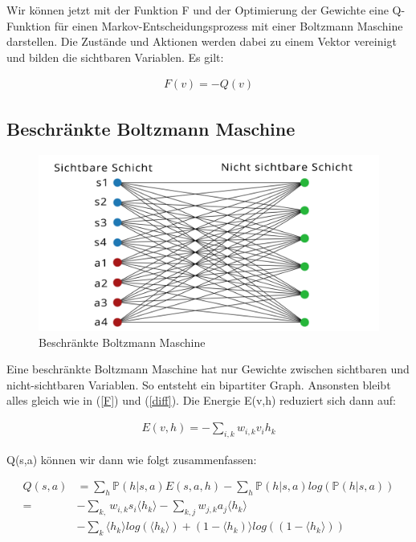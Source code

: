 Wir können jetzt mit der Funktion F und der Optimierung der Gewichte eine Q-Funktion für einen Markov-Entscheidungsprozess mit einer Boltzmann Maschine darstellen. Die Zustände und Aktionen werden dabei zu einem Vektor vereinigt und bilden die sichtbaren Variablen. Es gilt:

\begin{align}
	F(v) = - Q(v)
\end{align}

\subsection{Beschränkte Boltzmann Maschine}
\label{subsec:rbm}

\begin{figure}[hbt!]
\centering
\includegraphics[width=\textwidth]{Figures/rbm.png}
\caption{Beschränkte Boltzmann Maschine}
\label{police}
\end{figure}

Eine beschränkte Boltzmann Maschine hat nur Gewichte zwischen sichtbaren und nicht-sichtbaren Variablen. So entsteht ein bipartiter Graph. Ansonsten bleibt alles gleich wie in (\ref{F}) und (\ref{diff}). Die Energie E(v,h) reduziert sich dann auf:

\begin{align}
	E(v,h) = - \sum_{i,k}w_{i,k}v_ih_k
\end{align}

Q(s,a) können wir dann wie folgt zusammenfassen:

\begin{align*}
	Q(s,a) 	&= \sum_{h}\mathbb{P}(h|s,a)E(s,a,h) - \sum_{h}\mathbb{P}(h|s,a)log(\mathbb{P}(h|s,a))  \\
		=  	&- \sum_{k, } w_{i,k}s_i \langle h_k \rangle - \sum_{k,j} w_{j,k}a_j \langle h_k \rangle  \\
			&- \sum_{k} \langle h_k \rangle log(\langle h_k \rangle) + (1 -  \langle h_k) \rangle log( (1 - \langle h_k \rangle) ) 
\end{align*}

